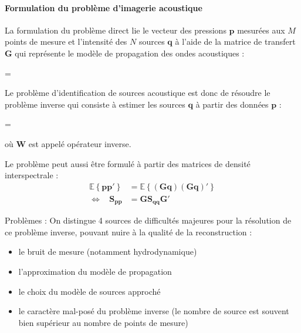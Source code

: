 \documentclass[twocolumn, 11pt]{article}
\renewenvironment{equation}{\vspace{-0.2cm}\begin{oldequation}}{\vspace{-0.2cm}\end{oldequation}}
\begin{document}
\paragraph{Formulation du problème d'imagerie acoustique}
La formulation du problème direct lie le vecteur des pressions $\bm{p}$ mesurées aux $M$ points de mesure et l'intensité des $N$ sources $\bm{q}$ à l'aide de la matrice de transfert $\bm{G}$ qui représente le modèle de propagation des ondes acoustiques : 
\begin{equation}
=
\end{equation}

Le problème d'identification de sources acoustique est donc de résoudre le problème inverse qui consiste à estimer les sources $\bm{q}$ à partir des données  $\bm{p}$ :
\begin{equation}
=
\end{equation}
où $\bm{W}$ est appelé opérateur inverse.

Le problème peut aussi être formulé à partir des matrices de densité interspectrale  : 
\begin{align}
		 \mathbb{E} \left\{ \bm{p p}' \right\} &= \mathbb{E} \left\{ (\bm{Gq})(\bm{Gq})' \right\}\\
	\Leftrightarrow~~~~  \bm{S_{pp}} &= \bm{G S_{qq}G}'
\end{align} 




Problèmes : On distingue 4 sources de difficultés majeures pour la résolution de ce problème inverse, pouvant nuire à la qualité de la reconstruction : \\
\begin{itemize}
	\item le bruit de mesure (notamment hydrodynamique)
	\item l'approximation du modèle de propagation
	\item le choix du modèle de sources approché
	\item le caractère mal-posé du problème inverse (le nombre de source est souvent bien supérieur au nombre de points de mesure)
\end{itemize}

\end{document}
